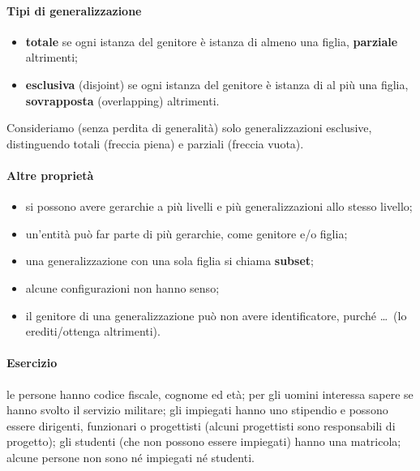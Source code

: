 \documentclass[a4paper,12pt]{article}
\begin{document}
\paragraph{Tipi di generalizzazione}
\begin{itemize}
  \item \textbf{totale} se ogni istanza del genitore è istanza di almeno una
    figlia, \textbf{parziale} altrimenti;
  \item \textbf{esclusiva} (disjoint) se ogni istanza del genitore è istanza di
    al più una figlia, \textbf{sovrapposta} (overlapping) altrimenti.
\end{itemize}
Consideriamo (senza perdita di generalità) solo generalizzazioni esclusive,
distinguendo totali (freccia piena) e parziali (freccia vuota).
\begin{center}
\end{center}

\paragraph{Altre proprietà}
\begin{itemize}
  \item si possono avere gerarchie a più livelli e più generalizzazioni allo
    stesso livello;
  \item un'entità può far parte di più gerarchie, come genitore e/o figlia;
  \item una generalizzazione con una sola figlia si chiama \textbf{subset};
  \item alcune configurazioni non hanno senso;
  \item il genitore di una generalizzazione può non avere identificatore,
    purché \dots\ (lo erediti/ottenga altrimenti).
\end{itemize}

\paragraph{Esercizio} le persone hanno codice fiscale, cognome ed età; per gli
uomini interessa sapere se hanno svolto il servizio militare; gli impiegati
hanno uno stipendio e possono essere dirigenti, funzionari o progettisti
(alcuni progettisti sono responsabili di progetto); gli studenti (che non
possono essere impiegati) hanno una matricola; alcune persone non sono né
impiegati né studenti.
\end{document}
